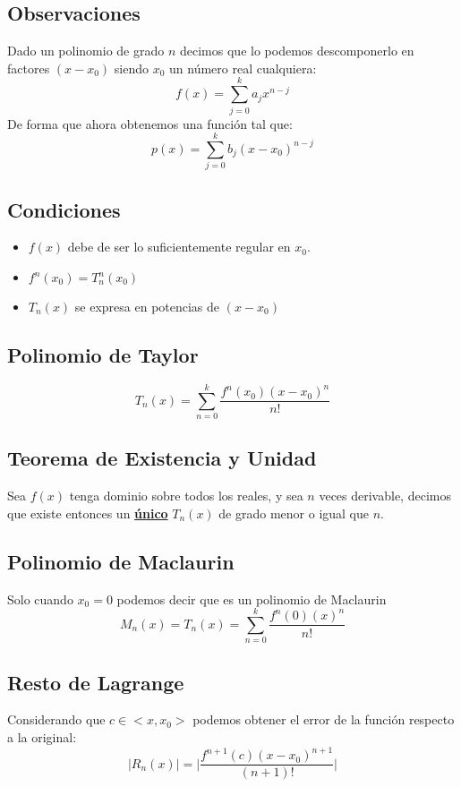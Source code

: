 \subsection{Observaciones}
 Dado un polinomio de grado \(n\) decimos que lo podemos descomponerlo en factores \((x-x_0)\) siendo \(x_0\) un número real cualquiera:
\[
        f(x) = \sum^k_{j=0} a_jx^{n - j}
\]
 De forma que ahora obtenemos una función tal que:
\[
        p(x) = \sum^k_{j=0} b_j(x-x_0)^{n - j}
\]
\subsection{Condiciones}
\begin{itemize}
        \item \(f(x)\) debe de ser lo suficientemente regular en \(x_0\).
        \item \(f^n(x_0) = T^n_n(x_0)\)
        \item \(T_n(x)\) se expresa en potencias de \((x-x_0)\)
\end{itemize}
\subsection{Polinomio de Taylor}
\[
        \boxed{T_n(x) = \sum^k_{n=0} \frac{f^n(x_0)(x-x_0)^n}{n!}}
\]
\subsection{Teorema de Existencia y Unidad}
 Sea \(f(x)\) tenga dominio sobre todos los reales, y sea \(n\) veces derivable, decimos que existe entonces un \underline{\textbf{único}} \(T_n(x)\) de grado menor o igual que \(n\).
\subsection{Polinomio de Maclaurin}
 Solo cuando \(x_0 = 0\) podemos decir que es un polinomio de Maclaurin
\[
        \boxed{M_n(x) = T_n(x) = \sum^k_{n=0} \frac{f^n(0)(x)^n}{n!}}
\]
\subsection{Resto de Lagrange}
 Considerando que \(c \in <x,x_0>\) podemos obtener el error de la función respecto a la original:
\[
        \boxed{\left | R_n(x) \right | = \Big | \frac{f^{n+1}(c) (x-x_0)^{n+1}}{(n+1)!}\Big |}
\]